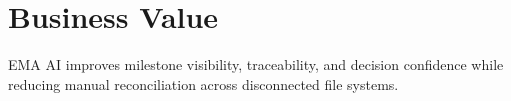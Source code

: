 \section{Business Value}
EMA AI improves milestone visibility, traceability, and decision confidence while reducing manual reconciliation across disconnected file systems.

